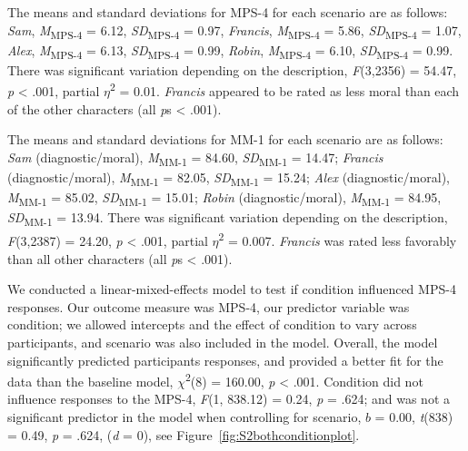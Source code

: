 \documentclass[
  man,floatsintext]{apa7}
\begin{document}
The means and standard deviations for MPS-4 for each scenario are as follows:
\emph{Sam},
\emph{M}\textsubscript{MPS-4} = 6.12, \emph{SD}\textsubscript{MPS-4} = 0.97,
\emph{Francis},
\emph{M}\textsubscript{MPS-4} = 5.86, \emph{SD}\textsubscript{MPS-4} = 1.07,
\emph{Alex},
\emph{M}\textsubscript{MPS-4} = 6.13, \emph{SD}\textsubscript{MPS-4} = 0.99,
\emph{Robin},
\emph{M}\textsubscript{MPS-4} = 6.10, \emph{SD}\textsubscript{MPS-4} = 0.99. There was significant variation depending on the description, \emph{F}(3,2356) = 54.47, \emph{p} \textless{} .001, partial \(\eta\)\textsuperscript{2} = 0.01. \emph{Francis} appeared to be rated as less moral than each of the other characters (all \emph{p}s \textless{} .001).

The means and standard deviations for MM-1 for each scenario are as follows:
\emph{Sam} (diagnostic/moral),
\emph{M}\textsubscript{MM-1} = 84.60, \emph{SD}\textsubscript{MM-1} = 14.47;
\emph{Francis} (diagnostic/moral),
\emph{M}\textsubscript{MM-1} = 82.05, \emph{SD}\textsubscript{MM-1} = 15.24;
\emph{Alex} (diagnostic/moral),
\emph{M}\textsubscript{MM-1} = 85.02, \emph{SD}\textsubscript{MM-1} = 15.01;
\emph{Robin} (diagnostic/moral),
\emph{M}\textsubscript{MM-1} = 84.95, \emph{SD}\textsubscript{MM-1} = 13.94. There was significant variation depending on the description, \emph{F}(3,2387) = 24.20, \emph{p} \textless{} .001, partial \(\eta\)\textsuperscript{2} = 0.007. \emph{Francis} was rated less favorably than all other characters (all \emph{p}s \textless{} .001).

We conducted a linear-mixed-effects model to test if condition influenced MPS-4 responses. Our outcome measure was MPS-4, our predictor variable was condition; we allowed intercepts and the effect of condition to vary across participants, and scenario was also included in the model.
Overall, the model significantly predicted participants responses, and provided a better fit for the data than the baseline model, \(\chi\)\textsuperscript{2}(8) = 160.00, \emph{p} \textless{} .001. Condition did not influence responses to the MPS-4, \emph{F}(1, 838.12) = 0.24, \emph{p} = .624; and was not a significant predictor in the model when controlling for scenario, \(b\) = 0.00, \emph{t}(838) = 0.49, \emph{p} = .624, (\emph{d} = 0), see Figure~\ref{fig:S2bothconditionplot}.
\end{document}
